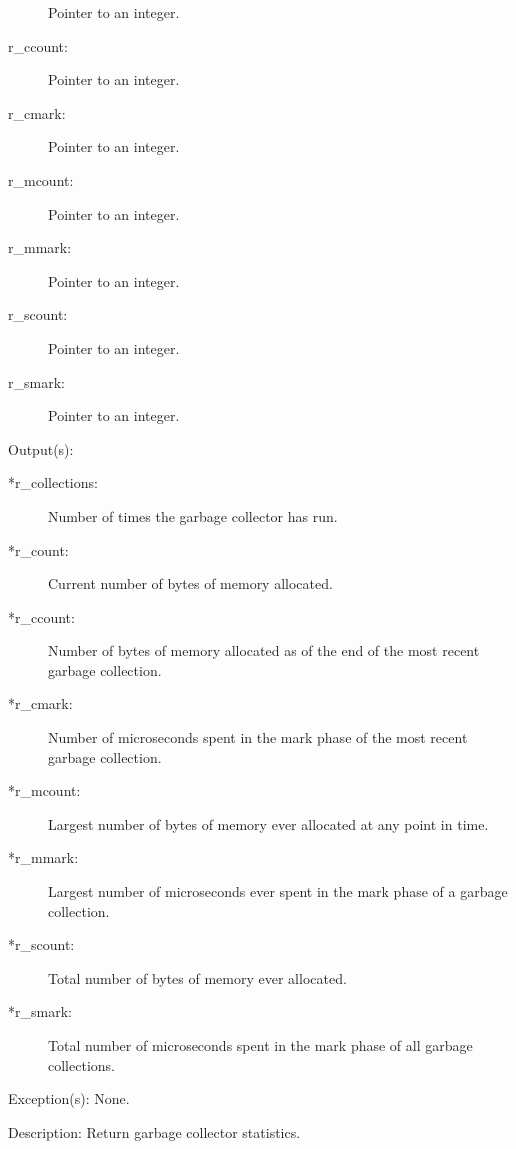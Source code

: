 \begin{capi}
\begin{capilist}
\begin{description}
			Pointer to an integer.
		\item[r\_ccount: ]
			Pointer to an integer.
		\item[r\_cmark: ]
			Pointer to an integer.
		\item[r\_mcount: ]
			Pointer to an integer.
		\item[r\_mmark: ]
			Pointer to an integer.
		\item[r\_scount: ]
			Pointer to an integer.
		\item[r\_smark: ]
			Pointer to an integer.
		\end{description}
	\item[Output(s): ]
		\begin{description}\item[]
		\item[*r\_collections: ]
			Number of times the garbage collector has run.
		\item[*r\_count: ]
			Current number of bytes of memory allocated.
		\item[*r\_ccount: ]
			Number of bytes of memory allocated as of the end of the
			most recent garbage collection.
		\item[*r\_cmark: ]
			Number of microseconds spent in the mark phase of the
			most recent garbage collection.
		\item[*r\_mcount: ]
			Largest number of bytes of memory ever allocated at any
			point in time.
		\item[*r\_mmark: ]
			Largest number of microseconds ever spent in the mark
			phase of a garbage collection.
		\item[*r\_scount: ]
			Total number of bytes of memory ever allocated.
		\item[*r\_smark: ]
			Total number of microseconds spent in the mark phase of
			all garbage collections.
		\end{description}
	\item[Exception(s): ] None.
	\item[Description: ]
		Return garbage collector statistics.
	\end{capilist}
\end{capi}
